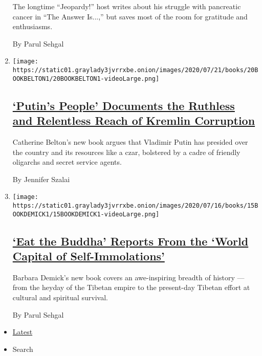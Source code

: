 \begin{enumerate}
  The longtime ``Jeopardy!'' host writes about his struggle with
  pancreatic cancer in ``The Answer Is...,'' but saves most of the room
  for gratitude and enthusiasms.

  By Parul Sehgal
\item
  \texttt{[image: https://static01.graylady3jvrrxbe.onion/images/2020/07/21/books/20BOOKBELTON1/20BOOKBELTON1-videoLarge.png]}

  \hypertarget{putins-people-documents-the-ruthless-and-relentless-reach-of-kremlin-corruption}{%
  \subsection{\texorpdfstring{\href{/2020/07/16/books/review-putins-people-kgb-catherine-belton.html}{`Putin's
  People' Documents the Ruthless and Relentless Reach of Kremlin
  Corruption}}{`Putin's People' Documents the Ruthless and Relentless Reach of Kremlin Corruption}}\label{putins-people-documents-the-ruthless-and-relentless-reach-of-kremlin-corruption}}

  Catherine Belton's new book argues that Vladimir Putin has presided
  over the country and its resources like a czar, bolstered by a cadre
  of friendly oligarchs and secret service agents.

  By Jennifer Szalai
\item
  \texttt{[image: https://static01.graylady3jvrrxbe.onion/images/2020/07/16/books/15BOOKDEMICK1/15BOOKDEMICK1-videoLarge.png]}

  \hypertarget{eat-the-buddha-reports-from-the-world-capital-of-self-immolations}{%
  \subsection{\texorpdfstring{\href{/2020/07/15/books/eat-buddha-life-death-tibetan-town-barbara-demick.html}{`Eat
  the Buddha' Reports From the `World Capital of
  Self-Immolations'}}{`Eat the Buddha' Reports From the `World Capital of Self-Immolations'}}\label{eat-the-buddha-reports-from-the-world-capital-of-self-immolations}}

  Barbara Demick's new book covers an awe-inspiring breadth of history
  --- from the heyday of the Tibetan empire to the present-day Tibetan
  effort at cultural and spiritual survival.

  By Parul Sehgal
\end{enumerate}

\begin{itemize}
\tightlist
\item
  \protect\hyperlink{stream-panel}{Latest}
\item
  Search
\end{itemize}

